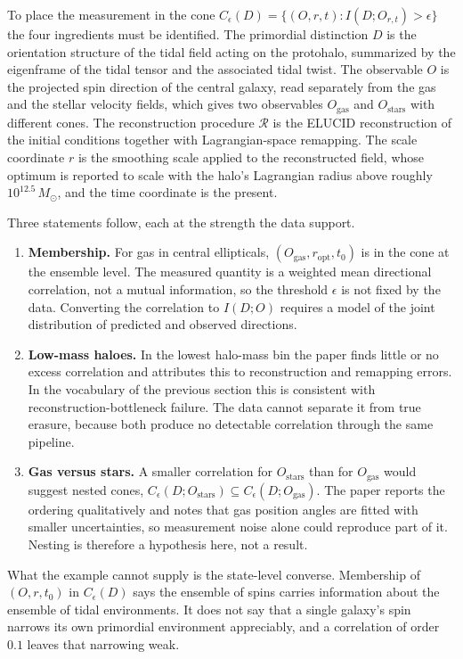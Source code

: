 \documentclass[12pt,a4paper,twoside,openright]{book}
\theoremstyle{plain}
\theoremstyle{definition}
\theoremstyle{remark}
\newcommand{\Pcone}{C_\epsilon}
\begin{document}
To place the measurement in the cone $\Pcone(D)=\{(O,r,t): I(D;O_{r,t})>\epsilon\}$ the four ingredients must be identified. The primordial distinction $D$ is the orientation structure of the tidal field acting on the protohalo, summarized by the eigenframe of the tidal tensor and the associated tidal twist. The observable $O$ is the projected spin direction of the central galaxy, read separately from the gas and the stellar velocity fields, which gives two observables $O_{\mathrm{gas}}$ and $O_{\mathrm{stars}}$ with different cones. The reconstruction procedure $\mathcal{R}$ is the ELUCID reconstruction of the initial conditions together with Lagrangian-space remapping. The scale coordinate $r$ is the smoothing scale applied to the reconstructed field, whose optimum is reported to scale with the halo's Lagrangian radius above roughly $10^{12.5}\,M_\odot$, and the time coordinate is the present.

Three statements follow, each at the strength the data support.

\begin{enumerate}
\item \textbf{Membership.} For gas in central ellipticals, $(O_{\mathrm{gas}}, r_{\mathrm{opt}}, t_0)$ is in the cone at the ensemble level. The measured quantity is a weighted mean directional correlation, not a mutual information, so the threshold $\epsilon$ is not fixed by the data. Converting the correlation to $I(D;O)$ requires a model of the joint distribution of predicted and observed directions.
\item \textbf{Low-mass haloes.} In the lowest halo-mass bin the paper finds little or no excess correlation and attributes this to reconstruction and remapping errors. In the vocabulary of the previous section this is consistent with reconstruction-bottleneck failure. The data cannot separate it from true erasure, because both produce no detectable correlation through the same pipeline.
\item \textbf{Gas versus stars.} A smaller correlation for $O_{\mathrm{stars}}$ than for $O_{\mathrm{gas}}$ would suggest nested cones, $\Pcone(D;O_{\mathrm{stars}})\subseteq\Pcone(D;O_{\mathrm{gas}})$. The paper reports the ordering qualitatively and notes that gas position angles are fitted with smaller uncertainties, so measurement noise alone could reproduce part of it. Nesting is therefore a hypothesis here, not a result.
\end{enumerate}

What the example cannot supply is the state-level converse. Membership of $(O,r,t_0)$ in $\Pcone(D)$ says the ensemble of spins carries information about the ensemble of tidal environments. It does not say that a single galaxy's spin narrows its own primordial environment appreciably, and a correlation of order $0.1$ leaves that narrowing weak.
\end{document}
